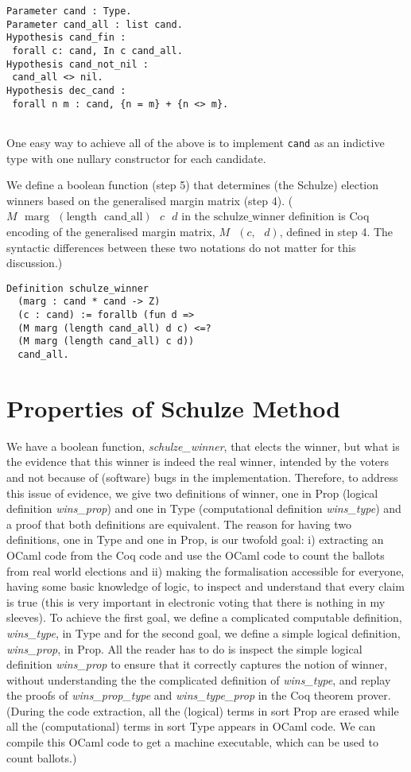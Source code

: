 \documentclass[compsoc,conference,a4paper,10pt,times]{IEEEtran}
\begin{document}
 \begin{verbatim}
Parameter cand : Type.
Parameter cand_all : list cand.
Hypothesis cand_fin : 
 forall c: cand, In c cand_all.
Hypothesis cand_not_nil : 
 cand_all <> nil.
Hypothesis dec_cand : 
 forall n m : cand, {n = m} + {n <> m}.


\end{verbatim}

One easy way to achieve all of the above is to implement
\texttt{cand} as an indictive type with one nullary constructor for
each candidate.


We define a boolean function (step 5) that determines 
(the Schulze) election winners based on 
the generalised margin matrix (step 4). ($M \text{ } \mathrm{marg} \text{ } 
(\mathrm{length} \text{ } \mathrm{cand\_all}) \text{ } c \text{ } d$
in the $\mathrm{schulze\_winner}$ definition is Coq encoding of the 
generalised margin matrix, 
$M \text{ } (c, \text{ }d)$, defined in step 4. The syntactic differences between these 
two notations do not matter  for this discussion.)
 \begin{verbatim}
Definition schulze_winner 
  (marg : cand * cand -> Z) 
  (c : cand) := forallb (fun d => 
  (M marg (length cand_all) d c) <=? 
  (M marg (length cand_all) c d))
  cand_all.
\end{verbatim}


\section{Properties of Schulze Method}
We have a boolean function,  \textit{schulze\_winner},  that 
elects the winner, but what is the evidence that 
this winner is indeed the real winner,  intended by the voters and 
not because of (software) bugs in the implementation. 
Therefore, to address this issue of
evidence, we give two definitions \cite{Pattinson:2017:SVE} of 
winner, one in Prop (logical definition \textit{wins\_prop}) 
and one in Type (computational definition \textit{wins\_type}) 
and a proof that both definitions are equivalent. The reason 
for having two definitions, one in Type and one in Prop, 
is our twofold goal: 
i) extracting an OCaml 
code from the Coq code and use the OCaml code 
to count the ballots from real world elections and ii)
making the formalisation accessible for everyone, having some basic
knowledge of logic, to inspect and understand that every claim 
is true (this is very important in electronic voting that 
there is nothing in my sleeves). To achieve the 
first goal, we define a complicated computable definition, 
\textit{wins\_type}, in Type 
and for the second goal, we define a simple logical definition,
\textit{wins\_prop}, in Prop. 
All the reader has to do is inspect the simple logical definition 
\textit{wins\_prop} to ensure that it correctly captures the notion 
of winner,  without understanding the the complicated
definition of \textit{wins\_type}, and replay the proofs of 
\textit{wins\_prop\_type} and \textit{wins\_type\_prop} in the Coq theorem prover. 
(During the code extraction, all the (logical) terms in sort Prop are erased while 
all the (computational) terms 
in sort Type appears in OCaml code. We can compile this OCaml code to get 
a machine executable, which can be used to count ballots.) 
\end{document}
